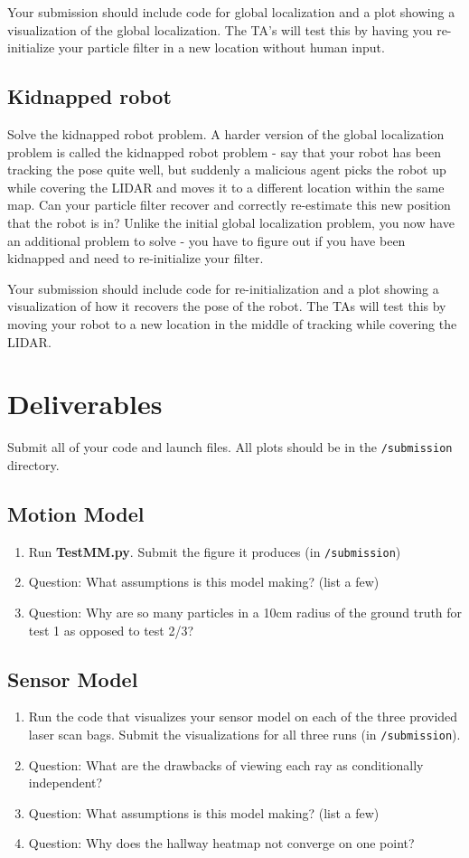 \documentclass[final]{article}
\begin{document}
Your submission should include code for global localization and a plot showing a visualization of the global localization. The TA’s will test this by having you re-initialize your particle filter in a new location without human input.

\subsection{Kidnapped robot}
Solve the kidnapped robot problem. A harder version of the global localization problem is called the
kidnapped robot problem - say that your robot has been tracking the pose quite well, but suddenly a
malicious agent picks the robot up while covering the LIDAR and moves it to a different location
within the same map. Can your particle filter recover and correctly re-estimate this new position that
the robot is in? Unlike the initial global localization problem, you now have an additional problem to
solve - you have to figure out if you have been kidnapped and need to re-initialize your filter. 

Your submission should include code for re-initialization and a plot showing a visualization of how it recovers the pose of the robot. The TAs will test this by moving your robot to a new location in the middle of tracking while covering the LIDAR.

\section{Deliverables}
Submit all of your code and launch files. All plots should be in the \texttt{/submission} directory.

\subsection{Motion Model}
\begin{enumerate}
\item Run \textbf{TestMM.py}. Submit the figure it produces (in \texttt{/submission})
\item Question: What assumptions is this model making? (list a few)
\item Question: Why are so many particles in a 10cm radius of the ground truth for test 1 as opposed to test 2/3?
\end{enumerate}

\subsection{Sensor Model}
\begin{enumerate}
\item Run the code that visualizes your sensor model on each of the three provided laser scan bags. Submit the visualizations for all three runs (in \texttt{/submission}).
\item Question: What are the drawbacks of viewing each ray as conditionally independent?
\item Question: What assumptions is this model making? (list a few)
\item Question: Why does the hallway heatmap not converge on one point?
\end{enumerate}
\end{document}
